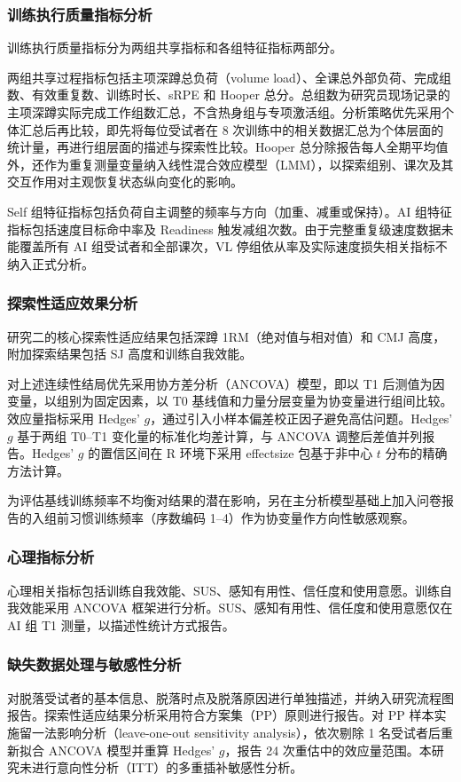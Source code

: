 \documentclass[UTF8,zihao=-4,twoside,openany]{ctexbook}
\begin{document}
\subsubsection{训练执行质量指标分析}
训练执行质量指标分为两组共享指标和各组特征指标两部分。

两组共享过程指标包括主项深蹲总负荷（volume load）、全课总外部负荷、完成组数、有效重复数、训练时长、sRPE 和 Hooper 总分。总组数为研究员现场记录的主项深蹲实际完成工作组数汇总，不含热身组与专项激活组。分析策略优先采用个体汇总后再比较，即先将每位受试者在 8 次训练中的相关数据汇总为个体层面的统计量，再进行组层面的描述与探索性比较。Hooper 总分除报告每人全期平均值外，还作为重复测量变量纳入线性混合效应模型（LMM），以探索组别、课次及其交互作用对主观恢复状态纵向变化的影响。

Self 组特征指标包括负荷自主调整的频率与方向（加重、减重或保持）。AI 组特征指标包括速度目标命中率及 Readiness 触发减组次数。由于完整重复级速度数据未能覆盖所有 AI 组受试者和全部课次，VL 停组依从率及实际速度损失相关指标不纳入正式分析。

\subsubsection{探索性适应效果分析}
研究二的核心探索性适应结果包括深蹲 1RM（绝对值与相对值）和 CMJ 高度，附加探索结果包括 SJ 高度和训练自我效能。

对上述连续性结局优先采用协方差分析（ANCOVA）模型，即以 T1 后测值为因变量，以组别为固定因素，以 T0 基线值和力量分层变量为协变量进行组间比较。效应量指标采用 Hedges' $g$，通过引入小样本偏差校正因子避免高估问题。Hedges' $g$ 基于两组 T0--T1 变化量的标准化均差计算，与 ANCOVA 调整后差值并列报告。Hedges' $g$ 的置信区间在 R 环境下采用 effectsize 包基于非中心 $t$ 分布的精确方法计算。

为评估基线训练频率不均衡对结果的潜在影响，另在主分析模型基础上加入问卷报告的入组前习惯训练频率（序数编码 1--4）作为协变量作方向性敏感观察。

\subsubsection{心理指标分析}
心理相关指标包括训练自我效能、SUS、感知有用性、信任度和使用意愿。训练自我效能采用 ANCOVA 框架进行分析。SUS、感知有用性、信任度和使用意愿仅在 AI 组 T1 测量，以描述性统计方式报告。

\subsubsection{缺失数据处理与敏感性分析}
对脱落受试者的基本信息、脱落时点及脱落原因进行单独描述，并纳入研究流程图报告。探索性适应结果分析采用符合方案集（PP）原则进行报告。对 PP 样本实施留一法影响分析（leave-one-out sensitivity analysis），依次剔除 1 名受试者后重新拟合 ANCOVA 模型并重算 Hedges' $g$，报告 24 次重估中的效应量范围。本研究未进行意向性分析（ITT）的多重插补敏感性分析。
\end{document}
